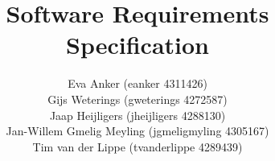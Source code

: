 \documentclass{tudelft-report}
\begin{document}
\frontmatter

\title[For MoodCat]{Software Requirements Specification}
\author{\small Eva Anker (eanker 4311426)\\
		Gijs Weterings (gweterings 4272587)\\
		Jaap Heijligers (jheijligers 4288130)\\
		Jan-Willem Gmelig Meyling (jgmeligmyling 4305167)\\
		Tim van der Lippe (tvanderlippe 4289439)}
\makecover



\tableofcontents




\mainmatter



\appendix

%


\end{document}
